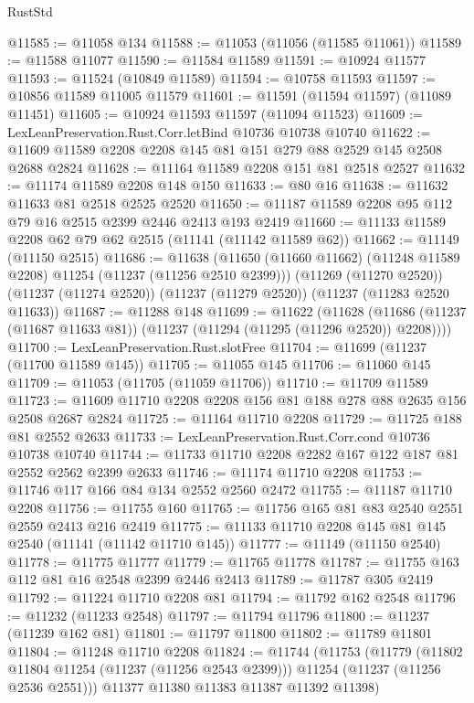 \begin{lexlean}{RustStd}
\begin{coremodule}
@11585 := @11058 @134
@11588 := @11053 (@11056 (@11585 @11061))
@11589 := @11588 @11077
@11590 := @11584 @11589
@11591 := @10924 @11577
@11593 := @11524 (@10849 @11589)
@11594 := @10758 @11593
@11597 := @10856 @11589 @11005 @11579
@11601 := @11591 (@11594 @11597) (@11089 @11451)
@11605 := @10924 @11593 @11597 (@11094 @11523)
@11609 := LexLeanPreservation.Rust.Corr.letBind @10736 @10738 @10740
@11622 := @11609 @11589 @2208 @2208 @145 @81 @151 @279 @88 @2529 @145 @2508 @2688 @2824
@11628 := @11164 @11589 @2208 @151 @81 @2518 @2527
@11632 := @11174 @11589 @2208 @148 @150
@11633 := @80 @16
@11638 := @11632 @11633 @81 @2518 @2525 @2520
@11650 := @11187 @11589 @2208 @95 @112 @79 @16 @2515 @2399 @2446 @2413 @193 @2419
@11660 := @11133 @11589 @2208 @62 @79 @62 @2515 (@11141 (@11142 @11589 @62))
@11662 := @11149 (@11150 @2515)
@11686 := @11638
    (@11650 (@11660 @11662) (@11248 @11589 @2208) @11254 (@11237 (@11256 @2510 @2399)))
    (@11269 (@11270 @2520))
    (@11237 (@11274 @2520))
    (@11237 (@11279 @2520))
    (@11237 (@11283 @2520 @11633))
@11687 := @11288 @148
@11699 := @11622
    (@11628 (@11686 (@11237 (@11687 @11633 @81)) (@11237 (@11294 (@11295 (@11296 @2520)) @2208))))
@11700 := LexLeanPreservation.Rust.slotFree
@11704 := @11699 (@11237 (@11700 @11589 @145))
@11705 := @11055 @145
@11706 := @11060 @145
@11709 := @11053 (@11705 (@11059 @11706))
@11710 := @11709 @11589
@11723 := @11609 @11710 @2208 @2208 @156 @81 @188 @278 @88 @2635 @156 @2508 @2687 @2824
@11725 := @11164 @11710 @2208
@11729 := @11725 @188 @81 @2552 @2633
@11733 := LexLeanPreservation.Rust.Corr.cond @10736 @10738 @10740
@11744 := @11733 @11710 @2208 @2282 @167 @122 @187 @81 @2552 @2562 @2399 @2633
@11746 := @11174 @11710 @2208
@11753 := @11746 @117 @166 @84 @134 @2552 @2560 @2472
@11755 := @11187 @11710 @2208
@11756 := @11755 @160
@11765 := @11756 @165 @81 @83 @2540 @2551 @2559 @2413 @216 @2419
@11775 := @11133 @11710 @2208 @145 @81 @145 @2540 (@11141 (@11142 @11710 @145))
@11777 := @11149 (@11150 @2540)
@11778 := @11775 @11777
@11779 := @11765 @11778
@11787 := @11755 @163 @112 @81 @16 @2548 @2399 @2446 @2413
@11789 := @11787 @305 @2419
@11792 := @11224 @11710 @2208 @81
@11794 := @11792 @162 @2548
@11796 := @11232 (@11233 @2548)
@11797 := @11794 @11796
@11800 := @11237 (@11239 @162 @81)
@11801 := @11797 @11800
@11802 := @11789 @11801
@11804 := @11248 @11710 @2208
@11824 := @11744
    (@11753
      (@11779
        (@11802 @11804 @11254 (@11237 (@11256 @2543 @2399)))
        @11254
        (@11237 (@11256 @2536 @2551)))
      @11377
      @11380
      @11383
      @11387
      @11392
      @11398)

\end{coremodule}
\end{lexlean}
